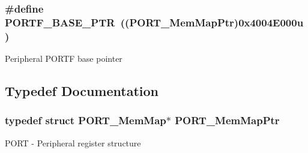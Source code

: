 \subsubsection[{P\+O\+R\+T\+F\+\_\+\+B\+A\+S\+E\+\_\+\+P\+T\+R}]{\setlength{\rightskip}{0pt plus 5cm}\#define P\+O\+R\+T\+F\+\_\+\+B\+A\+S\+E\+\_\+\+P\+T\+R~(({\bf P\+O\+R\+T\+\_\+\+Mem\+Map\+Ptr})0x4004\+E000u)}\label{group___p_o_r_t___peripheral_gadda5d5c0c6f7d718ac2ea336aea4f905}
Peripheral P\+O\+R\+T\+F base pointer 

\subsection{Typedef Documentation}
\hypertarget{group___p_o_r_t___peripheral_ga0e26bafb7c17808f90278627bcbcaf8c}{}
\subsubsection[{P\+O\+R\+T\+\_\+\+Mem\+Map\+Ptr}]{\setlength{\rightskip}{0pt plus 5cm}typedef struct {\bf P\+O\+R\+T\+\_\+\+Mem\+Map}$\ast$ {\bf P\+O\+R\+T\+\_\+\+Mem\+Map\+Ptr}}\label{group___p_o_r_t___peripheral_ga0e26bafb7c17808f90278627bcbcaf8c}
P\+O\+R\+T -\/ Peripheral register structure 